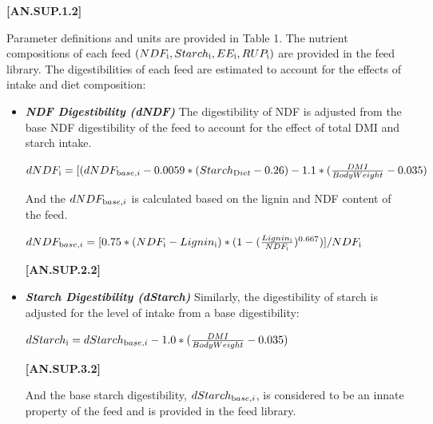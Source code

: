 \begin{refsection}
\begin{itemize}
            {\raggedleft \textbf{[AN.SUP.1.2]}\par}
            \vspace{0.5cm}

Parameter definitions and units are provided in Table 1. The nutrient compositions of each feed \( (NDF_{\text i}, Starch_{\text i}, EE_{\text i}, RUP_{\text i} )\) are provided in the feed library. The digestibilities of each feed are estimated to account for the effects of intake and diet composition:
\vspace{0.5cm}
\begin{itemize}
    \item \textbf{\textit{NDF Digestibility (dNDF)} }
    \vspace{0.25cm}
    The digestibility of NDF is adjusted from the base NDF digestibility of the feed to account for the effect of total DMI and starch intake. 
    \begin{center}
    \(dNDF_{\text i} = [ (dNDF_{\text base,i} - 0.0059*(Starch_{\text Diet} - 0.26)  - 1.1*(\frac{DMI}{BodyWeight} - 0.035) \)
    
    \end{center}
And the \(dNDF_{\text base,i}\) is calculated based on the lignin and NDF content of the feed.
    \vspace{0.25cm}
    
    \begin{center}
    \(dNDF_{\text base,i} = [0.75* (NDF_{\text i} - Lignin_{\text i}) * (1-( \frac{ Lignin_{\text i} }{NDF_{\text i} })^{0.667})] / NDF_{\text i} \)
    
    \end{center}
    \vspace{0.5cm}
    
            {\raggedleft \textbf{[AN.SUP.2.2]}\par}
            \vspace{0.5cm}
    \item \textbf{\textit{Starch Digestibility (dStarch)} }
    \vspace{0.25cm}
    Similarly, the digestibility of starch is adjusted for the level of intake from a base digestibility: 
     \begin{center}
    \(dStarch_{\text i} = dStarch_{\text base,i} - 1.0*(\frac{DMI}{BodyWeight} - 0.035) \)
    
    \end{center}
    \vspace{0.5cm}
            {\raggedleft \textbf{[AN.SUP.3.2]}\par}
    \vspace{0.25cm}
    And the base starch digestibility, \(dStarch_{\text base,i}\), is considered to be an innate property of the feed and is provided in the feed library.
    \vspace{0.5cm}


\end{itemize}
\end{itemize}
\end{refsection}
